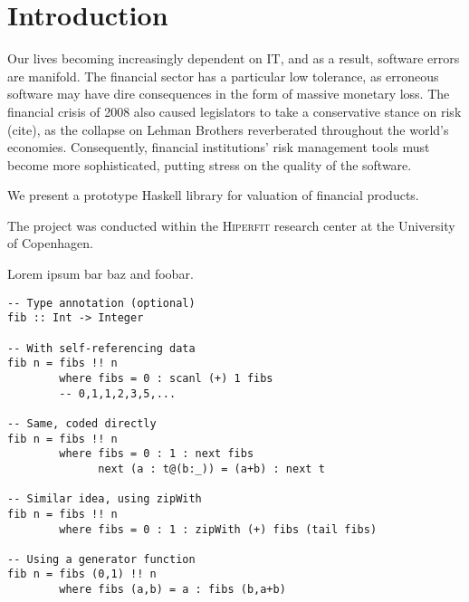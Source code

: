\chapter{Introduction}

Our lives becoming increasingly dependent on IT, and as a result, software errors are manifold. The financial sector has a particular low tolerance, as erroneous software may have dire consequences in the form of massive monetary loss.
The financial crisis of 2008 also caused legislators to take a conservative
stance on risk (cite), as the collapse on Lehman Brothers reverberated throughout the world's economies.
Consequently, financial institutions' risk management tools must become more sophisticated, putting stress on the quality of the software.

We present a prototype Haskell library for valuation of financial products.

The project was conducted within the \textsc{Hiperfit} research center at the
University of Copenhagen.


Lorem ipsum \gls{bar} \gls{baz} and \gls{foobar}.

\begin{verbatim}
-- Type annotation (optional)
fib :: Int -> Integer

-- With self-referencing data
fib n = fibs !! n
        where fibs = 0 : scanl (+) 1 fibs
        -- 0,1,1,2,3,5,...

-- Same, coded directly
fib n = fibs !! n
        where fibs = 0 : 1 : next fibs
              next (a : t@(b:_)) = (a+b) : next t

-- Similar idea, using zipWith
fib n = fibs !! n
        where fibs = 0 : 1 : zipWith (+) fibs (tail fibs)

-- Using a generator function
fib n = fibs (0,1) !! n
        where fibs (a,b) = a : fibs (b,a+b)
\end{verbatim}

\cite{Haskell}
